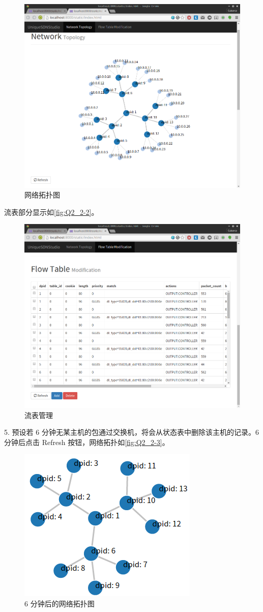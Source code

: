 \documentclass[format=draft,language=chinese,category=SDN]{hustreport}
\begin{document}
\begin{figure}[!h]
\centering
\includegraphics[width=.7\textwidth]{fig/2_2-1.png}
\caption{网络拓扑图}\label{fig:Q2_2-1}
\end{figure}

流表部分显示如\autoref{fig:Q2_2-2}。

\begin{figure}[!h]
\centering
\includegraphics[width=.7\textwidth]{fig/2_2-2.png}
\caption{流表管理}\label{fig:Q2_2-2}
\end{figure}

5. 预设若 6 分钟无某主机的包通过交换机，将会从状态表中删除该主机的记录。6 分钟后点击 Refresh 按钮，网络拓扑如\autoref{fig:Q2_2-3}。

\begin{figure}[!h]
\centering
\includegraphics[width=.4\textwidth]{fig/2_2-3.png}
\caption{6 分钟后的网络拓扑图}\label{fig:Q2_2-3}
\end{figure}
\end{document}
